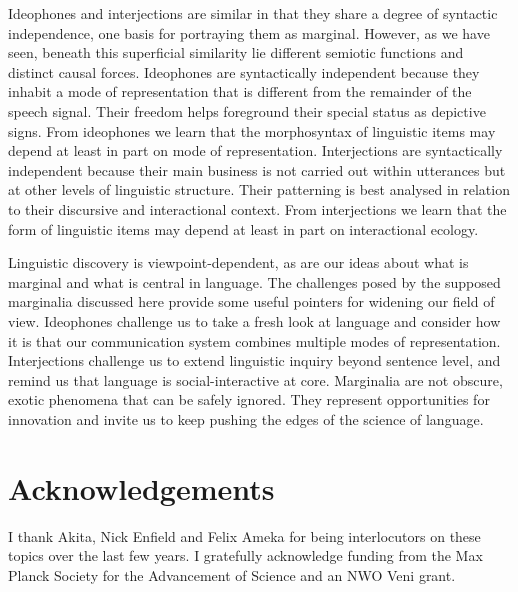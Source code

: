 \documentclass[output=paper]{langsci/langscibook}
\begin{document}
    Ideophones and interjections are similar in that they share a degree of syntactic independence, one basis for portraying them as marginal. However, as we have seen, beneath this superficial similarity lie different semiotic functions and distinct causal forces. Ideophones are syntactically independent because they inhabit a mode of representation that is different from the remainder of the speech signal. Their freedom helps foreground their special status as depictive signs. From ideophones we learn that the morphosyntax of linguistic items may depend at least in part on mode of representation. Interjections are syntactically independent because their main business is not carried out within utterances but at other levels of linguistic structure. Their patterning is best analysed in relation to their discursive and interactional context. From interjections we learn that the form of linguistic items may depend at least in part on interactional ecology.



Linguistic discovery is viewpoint-depen\-dent, as are our ideas about what is marginal and what is central in language. The challenges posed by the supposed marginalia discussed here provide some useful pointers for widening our field of view. Ideophones challenge us to take a fresh look at language and consider how it is that our communication system combines multiple modes of representation. Interjections challenge us to extend linguistic inquiry beyond sentence level, and remind us that language is social-interactive at core. Marginalia are not obscure, exotic phenomena that can be safely ignored. They represent opportunities for innovation and invite us to keep pushing the edges of the science of language.


\section*{Acknowledgements}

I thank  Akita, Nick Enfield and Felix Ameka for being interlocutors on these topics over the last few years. I gratefully acknowledge funding from the Max Planck Society for the Advancement of Science and an NWO Veni grant. 


{\sloppy
\printbibliography[heading=subbibliography,notkeyword=this]
}
\end{document}
